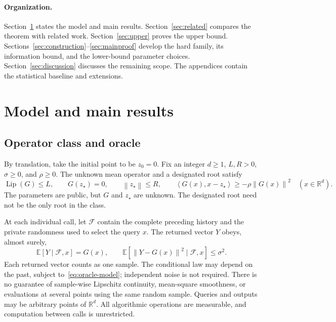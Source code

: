 \documentclass[11pt,a4paper]{article}
\newcommand{\R}{\mathbb R}
\newcommand{\E}{\mathbb E}
\newcommand{\norm}[1]{\left\lVert #1\right\rVert}
\newcommand{\inner}[2]{\left\langle #1,#2\right\rangle}
\DeclareMathOperator{\Lip}{Lip}
\theoremstyle{definition}
\theoremstyle{remark}
\begin{document}
\paragraph{Organization.}
Section~\ref{sec:model} states the model and main results.
Section~\ref{sec:related} compares the theorem with related work.
Section~\ref{sec:upper} proves the upper bound.
Sections~\ref{sec:construction}--\ref{sec:mainproof} develop the hard family,
its information bound, and the lower-bound parameter choices.
Section~\ref{sec:discussion} discusses the remaining scope.
The appendices contain the statistical baseline and extensions.

\section{Model and main results}\label{sec:model}

\subsection{Operator class and oracle}
By translation, take the initial point to be $z_0=0$. Fix an integer $d\ge1$,
$L,R>0$, $\sigma\ge0$, and $\rho\ge0$. The unknown mean operator and a
designated root satisfy
\begin{equation}\label{eq:model-geometry}
 \Lip(G)\le L,\qquad G(z_\star)=0,\qquad \norm{z_\star}\le R,
 \qquad
 \inner{G(x)}{x-z_\star}\ge-\rho\norm{G(x)}^2
 \quad(x\in\R^d).
\end{equation}
The parameters are public, but $G$ and $z_\star$ are unknown.
The designated root need not be the only root in the class.

At each individual call, let $\mathcal F$ contain the complete preceding
history and the private randomness used to select the query $x$.
The returned vector $Y$ obeys, almost surely,
\begin{equation}\label{eq:oracle-model}
 \E[Y\mid\mathcal F,x]=G(x),\qquad
 \E[\norm{Y-G(x)}^2\mid\mathcal F,x]\le\sigma^2.
\end{equation}
Each returned vector counts as one sample. The conditional law may depend
on the past, subject to~\eqref{eq:oracle-model}; independent noise is not
required. There is no guarantee of sample-wise Lipschitz continuity,
mean-square smoothness, or evaluations at several points using the same
random sample. Queries and outputs may be arbitrary points of $\R^d$.
All algorithmic operations are measurable, and computation between calls
is unrestricted.
\end{document}

